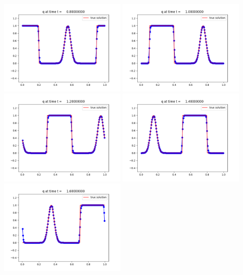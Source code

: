 \documentclass[11pt]{article}
\begin{document}
\vskip 10pt 
\includegraphics[width=0.475\textwidth]{frame0004fig1.png}
\vskip 10pt 
\includegraphics[width=0.475\textwidth]{frame0005fig1.png}
\vskip 10pt 
\includegraphics[width=0.475\textwidth]{frame0006fig1.png}
\vskip 10pt 
\includegraphics[width=0.475\textwidth]{frame0007fig1.png}
\vskip 10pt 
\includegraphics[width=0.475\textwidth]{frame0008fig1.png}
\end{document}
